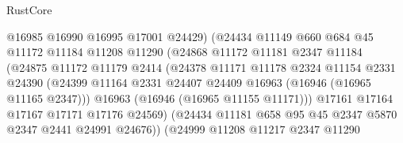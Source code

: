\begin{lexlean}{RustCore}
\begin{coremodule}
                                @16985
                                @16990
                                @16995
                                @17001
                                @24429)
                              (@24434
                                @11149
                                @660
                                @684
                                @45
                                @11172
                                @11184
                                @11208
                                @11290
                                (@24868
                                  @11172
                                  @11181
                                  @2347
                                  @11184
                                  (@24875
                                    @11172
                                    @11179
                                    @2414
                                    (@24378
                                      @11171
                                      @11178
                                      @2324
                                      @11154
                                      @2331
                                      @24390
                                      (@24399
                                        @11164
                                        @2331
                                        @24407
                                        @24409
                                        @16963
                                        (@16946 (@16965 @11165 @2347)))
                                      @16963
                                      (@16946 (@16965 @11155 @11171)))
                                    @17161
                                    @17164
                                    @17167
                                    @17171
                                    @17176
                                    @24569)
                                  (@24434
                                    @11181
                                    @658
                                    @95
                                    @45
                                    @2347
                                    @5870
                                    @2347
                                    @2441
                                    @24991
                                    @24676))
                                (@24999
                                  @11208
                                  @11217
                                  @2347
                                  @11290

\end{coremodule}
\end{lexlean}
